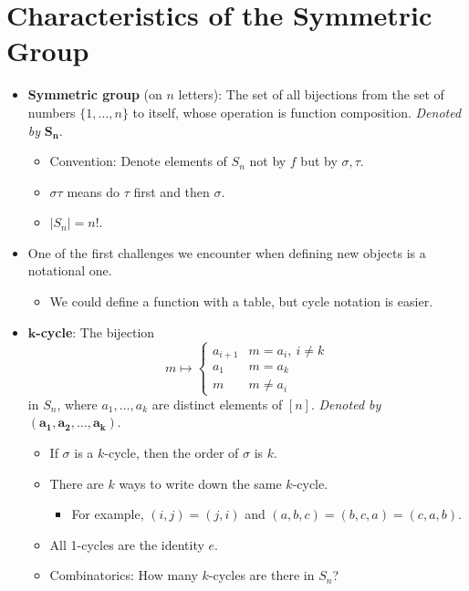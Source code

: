 \documentclass[../notes.tex]{subfiles}
\begin{document}
\section{Characteristics of the Symmetric Group}
\begin{itemize}
    \item {}\textbf{Symmetric group} (on $n$ letters): The set of all bijections from the set of numbers $\{1,\dots,n\}$ to itself, whose operation is function composition. \emph{Denoted by} $\bm{S_n}$.
    \begin{itemize}
        \item Convention: Denote elements of $S_n$ not by $f$ but by $\sigma,\tau$.
        \item $\sigma\tau$ means do $\tau$ first and then $\sigma$.
        \item $|S_n|=n!$.
    \end{itemize}
    \item One of the first challenges we encounter when defining new objects is a notational one.
    \begin{itemize}
        \item We could define a function with a table, but cycle notation is easier.
    \end{itemize}
    \item \textbf{$\bm{k}$-cycle}: The bijection
    \begin{equation*}
        m \mapsto
        \begin{cases}
            a_{i+1} & m=a_i,\ i\neq k\\
            a_1 & m=a_k\\
            m & m\neq a_i
        \end{cases}
    \end{equation*}
    in $S_n$, where $a_1,\dots,a_k$ are distinct elements of $[n]$. \emph{Denoted by} $\bm{(a_1,a_2,\ldots,a_k)}$.
    \begin{itemize}
        \item If $\sigma$ is a $k$-cycle, then the order of $\sigma$ is $k$.
        \item There are $k$ ways to write down the same $k$-cycle.
        \begin{itemize}
            \item For example, $(i,j)=(j,i)$ and $(a,b,c)=(b,c,a)=(c,a,b)$.
        \end{itemize}
        \item All 1-cycles are the identity $e$.
        \item Combinatorics: How many $k$-cycles are there in $S_n$?

\end{itemize}
\end{itemize}
\end{document}
